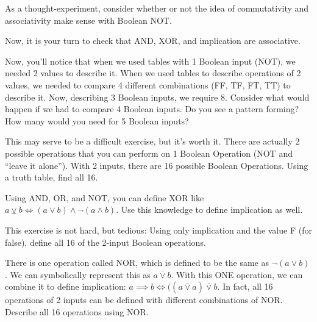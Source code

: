 \begin{exercise}
As a thought-experiment, consider whether or not the idea of commutativity and associativity make sense with Boolean NOT.
\end{exercise}

\begin{exercise}
Now, it is your turn to check that AND, XOR, and implication are associative.
\end{exercise}

\begin{exercise}
Now, you'll notice that when we used tables with 1 Boolean input (NOT), we needed 2 values to describe it. When we used tables to describe operations of 2 values, we needed to compare 4 different combinations (FF, TF, FT, TT) to describe it. Now, describing 3 Boolean inputs, we require 8. Consider what would happen if we had to compare 4 Boolean inputs. Do you see a pattern forming? How many would you need for 5 Boolean inputs?
\end{exercise}

\begin{exercise}
This may serve to be a difficult exercise, but it's worth it. There are actually 2 possible operations that you can perform on 1 Boolean Operation (NOT and ``leave it alone''). With 2 inputs, there are 16 possible Boolean Operations. Using a truth table, find all 16.
\end{exercise}

\begin{exercise}
Using AND, OR, and NOT, you can define XOR like $a \veebar b \iff (a \vee b) \wedge \neg (a \wedge b)$. Use this knowledge to define implication as well.
\end{exercise}

\begin{exercise}
This exercise is not hard, but tedious: Using only implication and the value F (for false), define all 16 of the 2-input Boolean operations.
\end{exercise}

\begin{exercise}
 There is one operation called NOR, which is defined to be the same as $\neg (a \vee b)$. We can symbolically represent this as $a \overline{\vee} b$. With this ONE operation, we can combine it to define implication: $a \implies b \iff ((a \overline{\vee} a) \overline{\vee} b$. In fact, all 16 operations of 2 inputs can be defined with different combinations of NOR. Describe all 16 operations using NOR.
\end{exercise}

